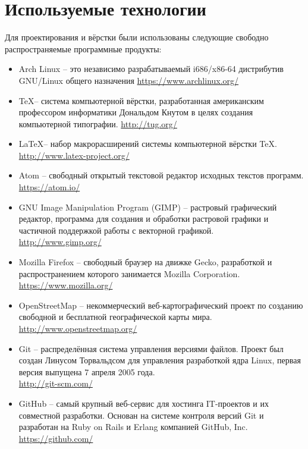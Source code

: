 \documentclass[a4paper, 14pt]{extreport}
\begin{document}
    \chapter{Используемые технологии}
    Для проектирования и вёрстки были использованы следующие свободно распространяемые программные 
    продукты:
    \begin{itemize}
        \item Arch Linux -- это независимо разрабатываемый i686/x86-64 дистрибутив GNU/Linux общего 
            назначения \url{https://www.archlinux.org/}
        \item \TeX -- система компьютерной вёрстки, разработанная американским профессором информатики 
            Дональдом Кнутом в целях создания компьютерной типографии.
            \url{http://tug.org/}
        \item \LaTeX -- набор макрорасширений системы компьютерной вёрстки TeX.\\
            \url{http://www.latex-project.org/}
        \item Atom -- свободный открытый текстовой редактор исходных текстов программ.
            \url{https://atom.io/}
        \item GNU Image Manipulation Program (GIMP) -- растровый графический редактор, программа для 
            создания и обработки растровой графики и частичной поддержкой работы с векторной графикой.\\
            \url{http://www.gimp.org/}
        \item Mozilla Firefox -- свободный браузер на движке Gecko, разработкой и распространением 
            которого занимается Mozilla Corporation.\\
            \url{https://www.mozilla.org/}
        \item OpenStreetMap -- некоммерческий веб-картографический проект по созданию свободной и 
            бесплатной географической карты мира.\\
            \url{http://www.openstreetmap.org/}
        \item Git -- распределённая система управления версиями файлов. Проект был создан Линусом 
            Торвальдсом для управления разработкой ядра Linux, первая версия выпущена 7 апреля 2005 года.\\
            \url{http://git-scm.com/}
        \item GitHub -- самый крупный веб-сервис для хостинга IT-проектов и их совместной разработки. 
            Основан на системе контроля версий Git и разработан на Ruby on Rails и Erlang компанией 
            GitHub, Inc.\\
            \url{https://github.com/}
    \end{itemize}
\end{document}
